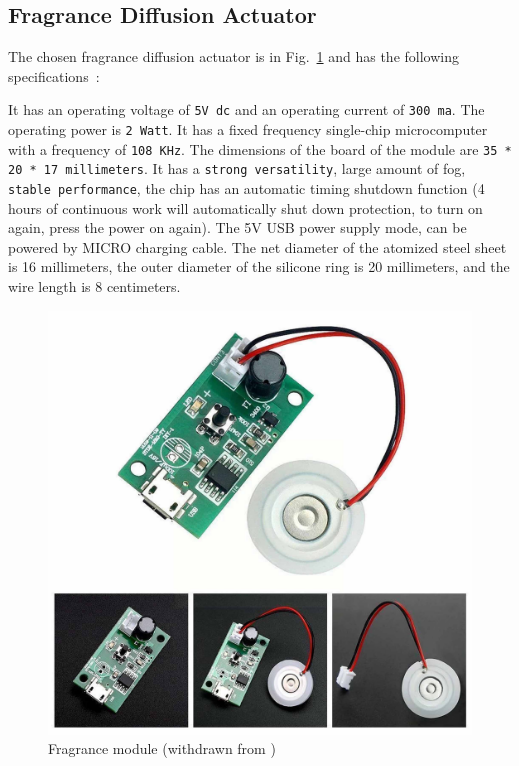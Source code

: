 


\subsection{Fragrance Diffusion Actuator}

The chosen fragrance diffusion actuator is in Fig.~\ref{fig:fragrance-module} and has the following specifications~\cite{fragrance-module}:

It has an operating voltage of \texttt{5V \gls{dc}} and an operating current of \texttt{300 \gls{ma}}. The operating power is \texttt{2 Watt}. It has a fixed frequency single-chip microcomputer with a frequency of \texttt{108 KHz}. The dimensions of the board of the module are \texttt{35 * 20 * 17 millimeters}.
It has a \texttt{strong versatility}, large amount of fog, \texttt{stable performance}, the chip has an automatic timing shutdown function (4 hours of continuous work will automatically shut down protection, to turn on again, press the power on again). The 5V USB power supply mode, can be powered by MICRO charging cable.
The net diameter of the atomized steel sheet is 16 millimeters, the outer diameter of the silicone ring is 20 millimeters, and the wire length is 8 centimeters.
%
\begin{figure}[htb!]
\centering
    \includegraphics[width=0.5\columnwidth]{./img/fragrance-module.jpg}
  \caption{Fragrance module (withdrawn from \cite{fragrance-module})}%
\label{fig:fragrance-module}
\end{figure}


